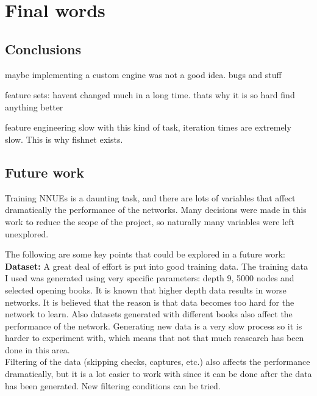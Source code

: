 \section{Final words}
\subsection{Conclusions}

maybe implementing a custom engine was not a good idea. bugs and stuff

feature sets: havent changed much in a long time. thats why it is so hard find anything better

feature engineering slow with this kind of task, iteration times are extremely slow. This is why fishnet exists.




\subsection{Future work}

Training NNUEs is a daunting task, and there are lots of variables that affect dramatically the performance of the networks. Many decisions were made in this work to reduce the scope of the project, so naturally many variables were left unexplored.

The following are some key points that could be explored in a future work: \\

\textbf{Dataset:} A great deal of effort is put into good training data. The training data I used was generated using very specific parameters: depth 9, 5000 nodes and selected opening books. It is known that higher depth data results in worse networks. It is believed that the reason is that data becomes too hard for the network to learn. Also datasets generated with different books also affect the performance of the network.  Generating new data is a very slow process so it is harder to experiment with, which means that not that much reasearch has been done in this area. \\
Filtering of the data (skipping checks, captures, etc.) also affects the performance dramatically, but it is a lot easier to work with since it can be done after the data has been generated. New filtering conditions can be tried. \\

